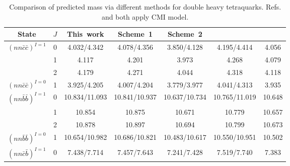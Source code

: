 \documentclass[prt,twocolumn,floatfix,nofootinbib]{revtex4}
\begin{document}
\renewcommand{\tabcolsep}{0.06cm}
\renewcommand{\arraystretch}{1.3}
\begin{table}[!htbp]
    \caption{Comparison of predicted mass via different methods for double heavy tetraquarks. Refs.\cite{Luo:2017eub} and \cite{Lu:2020rog} both apply CMI model.}
    \label{tab:comparison}
    \begin{tabular}{ccccccc}
        \hline\hline
        {\rm State}     &$J$    &{\rm This\ work}       & {\rm Scheme\ 1}\cite{Luo:2017eub}   & {\rm Scheme\ 2}\cite{Luo:2017eub}  &\cite{Lu:2020rog}      &\cite{Ebert:2007rn} \\ \hline
        ${(nn\bar{c}\bar{c})}^{I=1}$
                        &0      &4.032/4.342            &4.078/4.356                         &3.850/4.128                         &4.195/4.414            &4.056 \\
                        &1      &4.117                  &4.201                               &3.973                               &4.268                  &4.079 \\
                        &2      &4.179                  &4.271                               &4.044                               &4.318                  &4.118 \\
        ${(nn\bar{c}\bar{c})}^{I=0}$
                        &1      &3.925/4.205            &4.007/4.204                         &3.779/3.977                         &4.041/4.313            &3.935 \\
        ${(nn\bar{b}\bar{b})}^{I=1}$
                        &0      &10.834/11.093          &10.841/10.937                       &10.637/10.734                       &10.765/11.019          &10.648 \\
                        &1      &10.854                 &10.875                              &10.671                              &10.779                 &10.657 \\
                        &2      &10.878                 &10.897                              &10.694                              &10.799                 &10.673 \\
        ${(nn\bar{b}\bar{b})}^{I=0}$
                        &1      &10.654/10.982          &10.686/10.821                       &10.483/10.617                       &10.550/10.951          &10.502 \\
        ${(nn\bar{c}\bar{b})}^{I=1}$
                        &0      &7.438/7.714            &7.457/7.643                         &7.241/7.428                         &7.519/7.740            &7.383 \\

\end{tabular}
\end{table}
\end{document}
